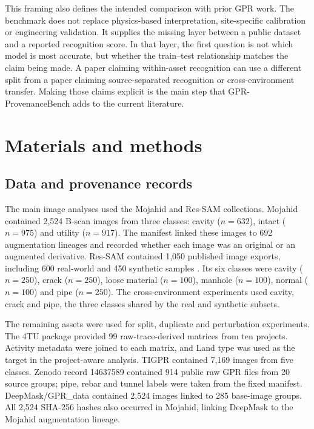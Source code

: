 \documentclass[]{interact}
\begin{document}
This framing also defines the intended comparison with prior GPR work. The benchmark does not replace physics-based interpretation, site-specific calibration or engineering validation. It supplies the missing layer between a public dataset and a reported recognition score. In that layer, the first question is not which model is most accurate, but whether the train--test relationship matches the claim being made. A paper claiming within-asset recognition can use a different split from a paper claiming source-separated recognition or cross-environment transfer. Making those claims explicit is the main step that GPR-ProvenanceBench adds to the current literature.

\section{Materials and methods}

\subsection{Data and provenance records}

The main image analyses used the Mojahid and Res-SAM collections. Mojahid contained 2,524 B-scan images from three classes: cavity ($n=632$), intact ($n=975$) and utility ($n=917$). The manifest linked these images to 692 augmentation lineages and recorded whether each image was an original or an augmented derivative. Res-SAM contained 1,050 published image exports, including 600 real-world and 450 synthetic samples \cite{zhou2025ressam}. Its six classes were cavity ($n=250$), crack ($n=250$), loose material ($n=100$), manhole ($n=100$), normal ($n=100$) and pipe ($n=250$). The cross-environment experiments used cavity, crack and pipe, the three classes shared by the real and synthetic subsets.

The remaining assets were used for split, duplicate and perturbation experiments. The 4TU package provided 99 raw-trace-derived matrices from ten projects. Activity metadata were joined to each matrix, and Land type was used as the target in the project-aware analysis. TIGPR contained 7,169 images from five classes. Zenodo record 14637589 contained 914 public raw GPR files from 20 source groups; pipe, rebar and tunnel labels were taken from the fixed manifest. DeepMask/GPR\_data contained 2,524 images linked to 285 base-image groups. All 2,524 SHA-256 hashes also occurred in Mojahid, linking DeepMask to the Mojahid augmentation lineage.
\end{document}
